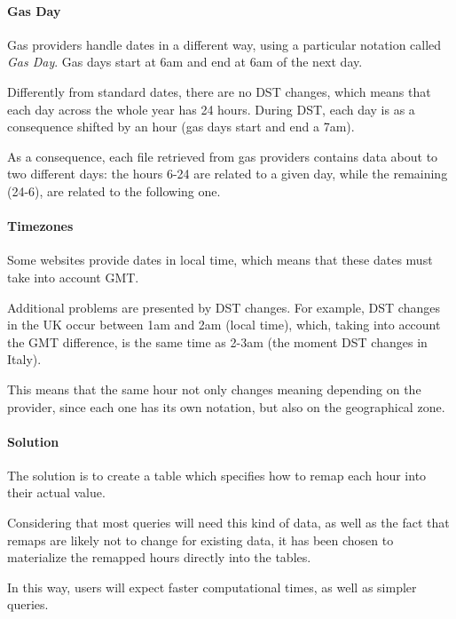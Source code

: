 \paragraph{Gas Day} \label{section:dwh:gas_day}
    Gas providers handle dates in a different way, using a particular notation called \textit{Gas Day}.
    Gas days start at 6am and end at 6am of the next day.
    
    Differently from standard dates, there are no DST changes, which means that each day across the whole year has 24 hours.
    During DST, each day is as a consequence shifted by an hour (gas days start and end a 7am).
    
    As a consequence, each file retrieved from gas providers contains data about to two different days: the hours 6-24 are related to a given day, while the remaining (24-6), are related to the following one.
    
\paragraph{Timezones}
    Some websites provide dates in local time, which means that these dates must take into account GMT.
    
    Additional problems are presented by DST changes.
    For example, DST changes in the UK occur between 1am and 2am (local time), which, taking into account the GMT difference, is the same time as 2-3am (the moment DST changes in Italy).
    
    This means that the same hour not only changes meaning depending on the provider, since each one has its own notation, but also on the geographical zone.
        
\paragraph{Solution}
    The solution is to create a table which specifies how to remap each hour into their actual value.
    
    Considering that most queries will need this kind of data, as well as the fact that remaps are likely not to change for existing data, it has been chosen to materialize the remapped hours directly into the tables.
    
    In this way, users will expect faster computational times, as well as simpler queries.
